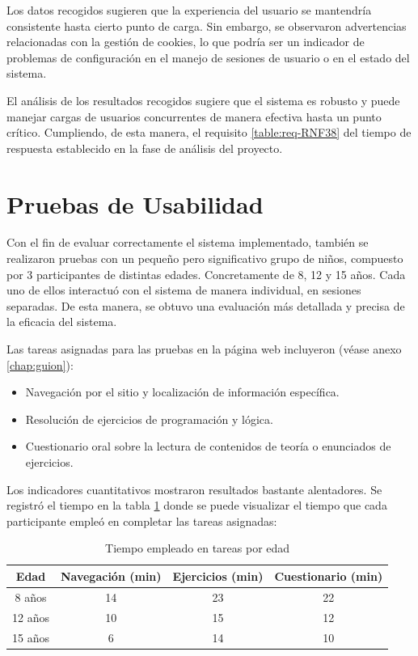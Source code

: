 Los datos recogidos sugieren que la experiencia del usuario se mantendría consistente hasta cierto punto de carga. Sin embargo, se observaron advertencias relacionadas con la gestión de cookies, lo que podría ser un indicador de problemas de configuración en el manejo de sesiones de usuario o en el estado del sistema.

El análisis de los resultados recogidos sugiere que el sistema es robusto y puede manejar cargas de usuarios concurrentes de manera efectiva hasta un punto crítico. Cumpliendo, de esta manera, el requisito \ref{table:req-RNF38} del tiempo de respuesta establecido en la fase de análisis del proyecto.

\section{Pruebas de Usabilidad}

Con el fin de evaluar correctamente el sistema implementado, también se realizaron pruebas con un pequeño pero significativo grupo de niños, compuesto por 3 participantes de distintas edades. Concretamente de 8, 12 y 15 años. Cada uno de ellos interactuó con el sistema de manera individual, en sesiones separadas. De esta manera, se obtuvo una evaluación más detallada y precisa de la eficacia del sistema.

Las tareas asignadas para las pruebas en la página web incluyeron (véase anexo \ref{chap:guion}):

\begin{itemize}
    \item Navegación por el sitio y localización de información específica.
    \item Resolución de ejercicios de programación y lógica.
    \item Cuestionario oral sobre la lectura de contenidos de teoría o enunciados de ejercicios.
\end{itemize}

Los indicadores cuantitativos mostraron resultados bastante alentadores. Se registró el tiempo en la tabla \ref{tab:pruebast} donde se puede visualizar el tiempo que cada participante empleó en completar las tareas asignadas:

\begin{table}[h]
\centering
\begin{tabular}{|c|c|c|c|}
\hline
Edad   & Navegación (min) & Ejercicios (min) & Cuestionario (min) \\ \hline
8 años & 14              & 23               & 22                 \\ \hline
12 años & 10              & 15               & 12                 \\ \hline
15 años & 6               & 14              & 10                 \\ \hline
\end{tabular}
\caption{Tiempo empleado en tareas por edad}
\label{tab:pruebast}
\end{table}

